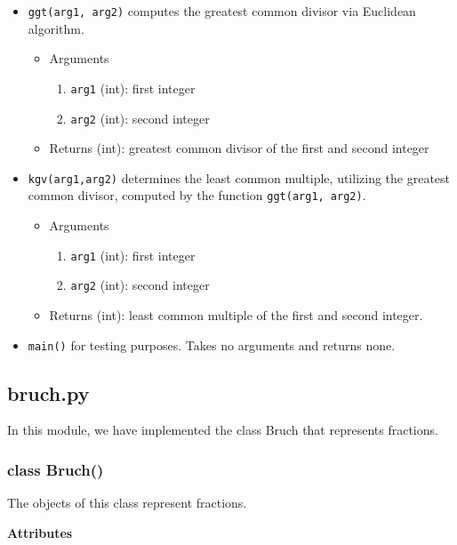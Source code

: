 \documentclass[refman]{scrartcl}
\begin{document}
\begin{itemize}
    \item \texttt{ggt(arg1, arg2)}
    computes the greatest common divisor via Euclidean algorithm.
    \begin{itemize}
        \item Arguments
        \begin{enumerate}
            \item \texttt{arg1} (int): first integer
            \item \texttt{arg2} (int): second integer
        \end{enumerate}
        \item Returns (int): greatest common divisor of the first and second integer
    \end{itemize}
    \item \texttt{kgv(arg1,arg2)}
    determines the least common multiple, utilizing the greatest common divisor, computed by the function \texttt{ggt(arg1, arg2)}.
    \begin{itemize}
        \item Arguments
        \begin{enumerate}
            \item \texttt{arg1} (int): first integer
            \item \texttt{arg2} (int): second integer
        \end{enumerate}
        \item Returns (int): least common multiple of the first and second integer.
    \end{itemize}
    \item \texttt{main()} for testing purposes. Takes no arguments and returns none.
\end{itemize}

\subsection{bruch.py}

In this module, we have implemented the class Bruch that represents fractions.

\subsubsection{class Bruch()}

The objects of this class represent fractions.

\noindent\textbf{Attributes}
\end{document}
